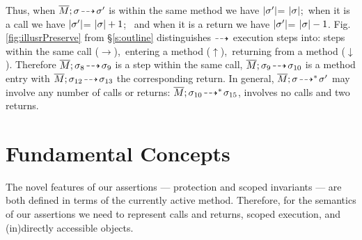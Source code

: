 {Thus, when $\overline{M};\sigma\! \dashrightarrow\! {\sigma'} $ is within the same method we have  $|\sigma'|$= $|\sigma|$;\  when it is a call we have
 $|\sigma'|$= $|\sigma|+1$; \ and when it is a return we have  $|\sigma'|$= $|\sigma|-1$.}
Fig. \ref{fig:illusrPreserve}  from \S \ref{s:outline} %
distinguishes %
  ${\dashrightarrow}$ {execution} steps into: %
steps within the same  call ($\rightarrow$),\   entering a method  ($\uparrow$),\    returning from a method  ($\downarrow$).
Therefore $\overline{M};\sigma_8\! \dashrightarrow\! {\sigma_9} $ is a step within the same call, 
$\overline{M};\sigma_9\! \dashrightarrow\! {\sigma_{10}} $ is a method entry with $\overline{M};\sigma_{12}\! \dashrightarrow\! {\sigma_{13}} $
the corresponding return. 
In general,  $\overline{M};\sigma\! \dashrightarrow^*\! {\sigma'}$ may involve {any}  number of  calls or returns: \eg
$\overline{M};\sigma_{10}\! \dashrightarrow^*\! {\sigma_{15}}$,   involves no calls and two returns.


%
 

\section{Fundamental  Concepts}
\label{s:auxiliary}

The novel features of our assertions — protection and scoped invariants %
— are both defined in terms of the currently active method.
Therefore, for the semantics of our   assertions we need to represent calls and returns, scoped execution, and (in)directly accessible objects.


